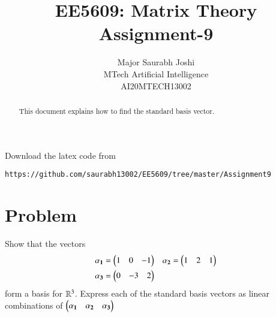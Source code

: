 \documentclass[journal,12pt,twocolumn]{IEEEtran}
\begin{document}
\makeatletter
{}
\makeatother
\let\StandardTheFigure\thefigure
\let\vec\mathbf
\renewcommand{\thefigure}{\theproblem}
\def\putbox#1#2#3{\makebox[0in][l]{\makebox[#1][l]{}\raisebox{\baselineskip}[0in][0in]{\raisebox{#2}[0in][0in]{#3}}}}
     \def\rightbox#1{\makebox[0in][r]{#1}}
     \def\centbox#1{\makebox[0in]{#1}}
     \def\topbox#1{\raisebox{-\baselineskip}[0in][0in]{#1}}
     \def\midbox#1{\raisebox{-0.5\baselineskip}[0in][0in]{#1}}
\vspace{3cm}
\title{EE5609: Matrix Theory\\
          Assignment-9\\}
\author{Major Saurabh Joshi\\MTech Artificial Intelligence\\AI20MTECH13002 }
\maketitle
\newpage
\bigskip
\renewcommand{\thefigure}{\theenumi}
\renewcommand{\thetable}{\theenumi}
\begin{abstract}
This document explains how to find the standard basis vector.  
\end{abstract}
Download the latex code from 
%
%
%
\begin{lstlisting}
https://github.com/saurabh13002/EE5609/tree/master/Assignment9
\end{lstlisting}
%
\section{Problem}
Show that the vectors 
\begin{align}
& \vec{\alpha_1} = \myvec{1 & 0 & -1} & \vec{\alpha_2} = \myvec{1 & 2 & 1 } \\
& \vec{\alpha_3} = \myvec{0 & -3 & 2}
\end{align}
form a basis for $\mathbb{R}^3$. Express each of the standard basis vectors as linear combinations
of $\myvec{\vec{\alpha_1} &  \vec{\alpha_2} & \vec{\alpha_3}}$
\end{document}
